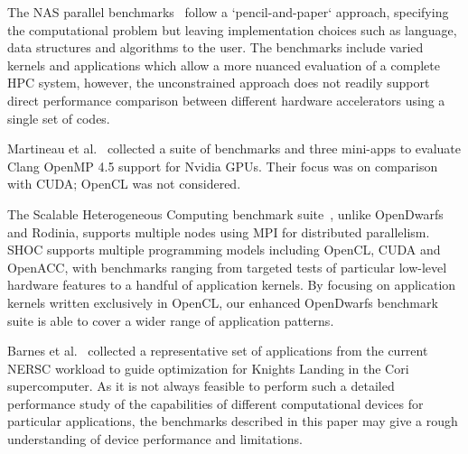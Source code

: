 \documentclass[../document.tex]{subfiles}
\begin{document}
\label{sec:related_work}
	
The NAS parallel benchmarks~\cite{bailey1991parallel} follow a `pencil-and-paper` approach, specifying the computational problem but leaving implementation choices such as language, data structures and algorithms to the user.
The benchmarks include varied kernels and applications which allow a more nuanced evaluation of a complete HPC system, however, the unconstrained approach does not readily support direct performance comparison between different hardware accelerators using a single set of codes.

Martineau et al.~\cite{martineau2016performance} collected a suite of benchmarks and three mini-apps to evaluate Clang OpenMP 4.5 support for Nvidia GPUs.
Their focus was on comparison with CUDA; OpenCL was not considered.

The Scalable Heterogeneous Computing benchmark suite~\cite{lopez2015examining}, unlike OpenDwarfs and Rodinia, supports multiple nodes using MPI for distributed parallelism.
SHOC supports multiple programming models including OpenCL, CUDA and OpenACC, with benchmarks ranging from targeted tests of particular low-level hardware features to a handful of application kernels.
By focusing on application kernels written exclusively in OpenCL, our enhanced OpenDwarfs benchmark suite is able to cover a wider range of application patterns.

Barnes et al.~\cite{barnes2016evaluating} collected a representative set of applications from the current NERSC workload to guide optimization for Knights Landing in the Cori supercomputer.
As it is not always feasible to perform such a detailed performance study of the capabilities of different computational devices for particular applications, the benchmarks described in this paper may give a rough understanding of device performance and limitations.
\end{document}
